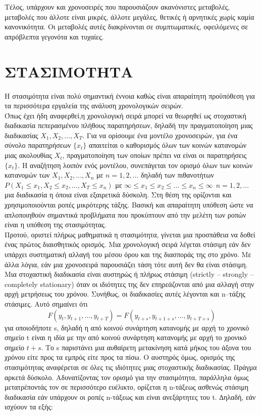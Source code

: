 Τέλος, υπάρχουν και χρονοσειρές που παρουσιάζουν ακανόνιστες μεταβολές, μεταβολές που άλλοτε είναι μικρές, άλλοτε μεγάλες, θετικές ή αρνητικές
χωρίς καμία κανονικότητα. Οι μεταβολές αυτές διακρίνονται σε συμπτωματικές,
οφειλόμενες σε απρόβλεπτα γεγονότα και τυχαίες.
\section{ΣΤΑΣΙΜΟΤΗΤΑ}
Η στασιμότητα είναι πολύ σημαντική έννοια καθώς είναι απαραίτητη προϋπόθεση για τα περισσότερα εργαλεία της ανάλυση χρονολογικών σειρών.\\

Όπως έχει ήδη αναφερθεί,η χρονολογική σειρά μπορεί να θεωρηθεί ως στοχαστική
διαδικασία πεπερασμένου πλήθους παρατηρήσεων, δηλαδή την πραγματοποίηση μιας διαδικασίας $ X_1,X_2,\ldots,X_T.$ Για να ορίσουμε ένα μοντέλο χρονοσειρών, για ένα σύνολο παρατηρήσεων $\{x_t\} $
απαιτείται ο καθορισμός όλων των κοινών κατανομών μιας ακολουθίας $ X_t$, πραγματοποίηση των οποίων πρέπει να είναι οι παρατηρήσεις $\{x_t\}. $ Η
αναζήτηση λοιπόν ενός μοντέλου, συνεπάγεται τον ορισμό όλων των κοινών κατανομών των $ X_1,X_2,\ldots,X_n$ με $n=1,2,\ldots$ δηλαδή των πιθανοτήτων \\
$ P \left( X_1 \leq x_1,X_2 \leq x_2, \ldots,X_T\leq x_n \right) $ 
με $\infty \leq  x_1 \leq x_2 \leq \ldots \leq x_n \leq \infty \:\: n=1,2,\ldots$
μια διαδικασία η όποια είναι εξαιρετικά δύσκολη. Στη θέση της ορίζονται και χρησιμοποιούνται ροπές μικρότερης τάξης. Βασική και απαραίτητη υπόθεση ώστε να απλοποιηθούν σημαντικά προβλήματα που προκύπτουν από την μελέτη των ροπών είναι η υπόθεση της στασιμότητας.\\

Προτού, οριστεί πλήρως μαθηματικά η στασιμότητα, γίνεται μια προσπάθεια να δοθεί ένας πρώτος διαισθητικός ορισμός. Μια χρονολογική σειρά λέγεται στάσιμη εάν δεν υπάρχει συστηματική αλλαγή του μέσου όρου και της διασποράς της στο
χρόνο. Με άλλα λόγια, εάν μια χρονοσειρά παρουσιάζει τάση τότε αυτή δεν θα είναι στάσιμη.\\

Μια στοχαστική διαδικασία είναι αυστηρώς ή πλήρως στάσιμη (strictly – strongly – completely stationary) όταν οι ιδιότητες της δεν επηρεάζονται από μια αλλαγή στην αρχή μετρήσεως του χρόνου.
Συνήθως, οι διαδικασίες αυτές λέγονται και n–τάξης στάσιμες. Αυτό σημαίνει ότι 
$$ F\left( y_t,y_{t+1},\ldots ,y_{t+T}\right)=F\left(y_{t+s},y_{t+1+s}, \ldots,y_{t+T+s}\right) $$
για οποιοδήποτε s, δηλαδή η από κοινού συνάρτηση κατανομής με αρχή το χρονικό σημείο t είναι η ιδία με την από κοινού συνάρτηση κατανομής με αρχή το χρονικό σημείο $t+s$. Το s παριστάνει μια
αυθαίρετη μετακίνηση κατά μήκος του άξονα του χρόνου είτε προς τα εμπρός είτε προς τα πίσω. Ο αυστηρός όμως, ορισμός της στασιμότητας αναφέρεται σε όλες τις ιδιότητες μιας στοχαστικής διαδικασίας. Πράγμα αρκετά δύσκολο. Αδυνατίζοντας τον ορισμό για την στασιμότητα, παράλληλα όμως μετατρέποντάς τον σε
περισσότερο ευέλικτο, ορίζεται η n-τάξεως ασθενώς στάσιμη διαδικασία εάν
υπάρχουν οι ροπές n-τάξεως και είναι ανεξάρτητες του t. ∆ηλαδή, εάν ισχύουν τα εξής:\\

